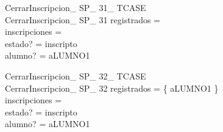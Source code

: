 \documentclass{article}
\begin{document}
\begin{schema}{CerrarInscripcion\_ SP\_ 31\_ TCASE}\\
 CerrarInscripcion\_ SP\_ 31 
\where
 registrados =~\emptyset \\
 inscripciones =~\emptyset \\
 estado? = inscripto \\
 alumno? = aLUMNO1
\end{schema}

\begin{schema}{CerrarInscripcion\_ SP\_ 32\_ TCASE}\\
 CerrarInscripcion\_ SP\_ 32 
\where
 registrados = \{ aLUMNO1 \} \\
 inscripciones =~\emptyset \\
 estado? = inscripto \\
 alumno? = aLUMNO1
\end{schema}
\end{document}

